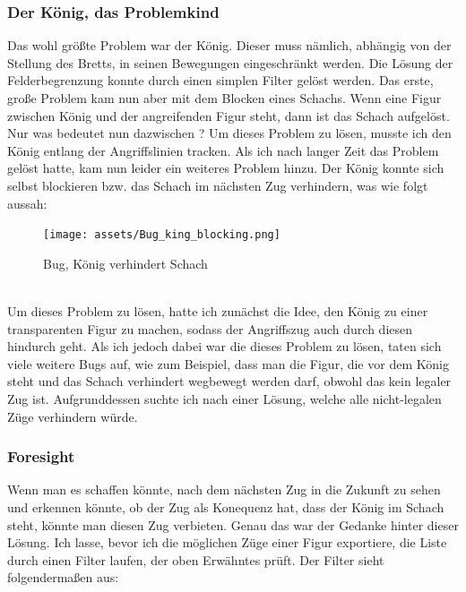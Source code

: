 \documentclass[a4paper, 10pt]{scrartcl}
\begin{document}
\subsubsection{Der König, das Problemkind}
Das wohl größte Problem war der König. Dieser muss nämlich, abhängig von der Stellung des Bretts,
in seinen Bewegungen eingeschränkt werden. Die Lösung der Felderbegrenzung konnte durch einen simplen Filter gelöst werden. Das erste, große Problem kam nun aber mit dem
Blocken eines Schachs. Wenn eine Figur zwischen König und der angreifenden Figur steht, dann ist das Schach aufgelöst. Nur was bedeutet nun \glqq{}dazwischen \grqq?
Um dieses Problem zu lösen, musste ich den König entlang der Angriffslinien \glqq{}tracken\grqq{}. Als ich nach langer Zeit das Problem gelöst hatte, kam nun leider ein weiteres Problem hinzu. 
Der König konnte sich selbst blockieren bzw. das Schach im nächsten Zug verhindern, was wie folgt aussah: 
\begin{figure}[!h]
\centering
\texttt{[image: assets/Bug\_king\_blocking.png]}
\caption{Bug, König verhindert Schach}
\end{figure}\\
Um dieses Problem zu lösen, hatte ich zunächst die Idee, den König zu einer \glqq{}transparenten
Figur\grqq{} zu machen, sodass der Angriffszug auch durch diesen hindurch geht. 
Als ich jedoch dabei war die dieses Problem zu lösen, taten sich viele weitere Bugs auf, wie zum Beispiel, dass man die 
Figur, die vor dem König steht und das Schach verhindert wegbewegt werden darf, obwohl das kein legaler Zug ist.
Aufgrunddessen suchte ich nach einer Lösung, welche alle nicht-legalen Züge verhindern würde.

\subsubsection{Foresight}
Wenn man es schaffen könnte, nach dem nächsten Zug in die Zukunft zu sehen und erkennen könnte, ob
der Zug als Konequenz hat, dass der König im Schach steht, könnte man diesen Zug verbieten. 
Genau das war der Gedanke hinter dieser Lösung. Ich lasse, bevor ich die möglichen Züge
einer Figur exportiere, die Liste durch einen Filter laufen, der oben Erwähntes prüft.
Der Filter sieht folgendermaßen aus:
\end{document}
